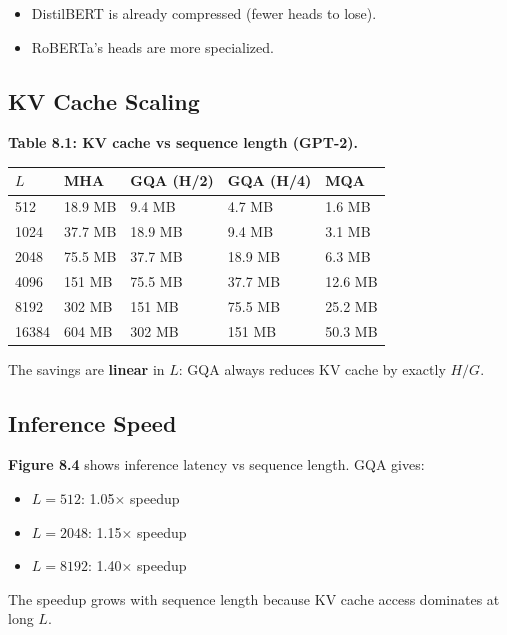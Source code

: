 \begin{itemize}
\item DistilBERT is already compressed (fewer heads to lose).
\item RoBERTa's heads are more specialized.

\end{itemize}
\subsection{KV Cache Scaling}

\textbf{Table 8.1: KV cache vs sequence length (GPT-2).}

\begin{table}[H]
\centering
\small
\begin{tabular}{lllll}
\toprule
\textbf{$L$} & \textbf{MHA} & \textbf{GQA (H/2)} & \textbf{GQA (H/4)} & \textbf{MQA} \\
\midrule
512 & 18.9 MB & 9.4 MB & 4.7 MB & 1.6 MB \\
1024 & 37.7 MB & 18.9 MB & 9.4 MB & 3.1 MB \\
2048 & 75.5 MB & 37.7 MB & 18.9 MB & 6.3 MB \\
4096 & 151 MB & 75.5 MB & 37.7 MB & 12.6 MB \\
8192 & 302 MB & 151 MB & 75.5 MB & 25.2 MB \\
16384 & 604 MB & 302 MB & 151 MB & 50.3 MB \\
\bottomrule
\end{tabular}
\end{table}

The savings are \textbf{linear} in $L$: GQA always reduces KV cache by exactly 
$H / G$.

\subsection{Inference Speed}

\textbf{Figure 8.4} shows inference latency vs sequence length. GQA gives:

\begin{itemize}
\item $L = 512$: 1.05$\times$ speedup
\item $L = 2048$: 1.15$\times$ speedup
\item $L = 8192$: 1.40$\times$ speedup

\end{itemize}
The speedup grows with sequence length because KV cache access dominates 
at long $L$.

